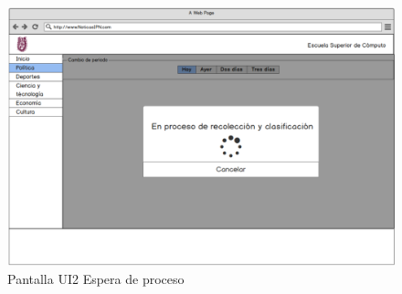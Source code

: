 \begin{figure}[H]
  \centering 
	\includegraphics[scale=.35]{imagenes/Pantallas/UI2}
  \caption{Pantalla UI2 Espera de proceso}
  \label{fig:UI2}
\end{figure}

